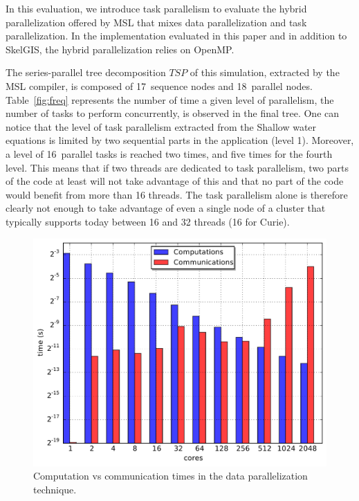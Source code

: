 In this evaluation, we introduce task parallelism to evaluate the hybrid parallelization offered by MSL that mixes data parallelization and task parallelization.
In the implementation evaluated in this paper and in addition to SkelGIS, the hybrid parallelization relies on OpenMP.

The series-parallel tree decomposition $TSP$ of this simulation, extracted by the MSL compiler, is composed of 17~sequence nodes and 18~parallel nodes. Table~\ref{fig:freq} represents the number of time a given level of parallelism, \ie the number of tasks to perform concurrently, is observed in the final tree. One can notice that the level of task parallelism extracted from the Shallow water equations is limited by two sequential parts in the application (level 1). Moreover, a level of 16~parallel tasks is reached two times, and five times for the fourth level.
This means that if two threads are dedicated to task parallelism, two parts of the code at least will not take advantage of this and that no part of the code would benefit from more than 16 threads.
The task parallelism alone is therefore clearly not enough to take advantage of even a single node of a cluster that typically supports today between 16 and 32 threads (16 for Curie).

\begin{figure}[bh]\begin{center}
  \includegraphics[width=.6\textwidth]{../results/task_scaling/500_200/analytic/times.pdf}
  \caption{Computation vs communication times in the data parallelization technique.}
  \label{fig:limit}
\end{center}\end{figure}

